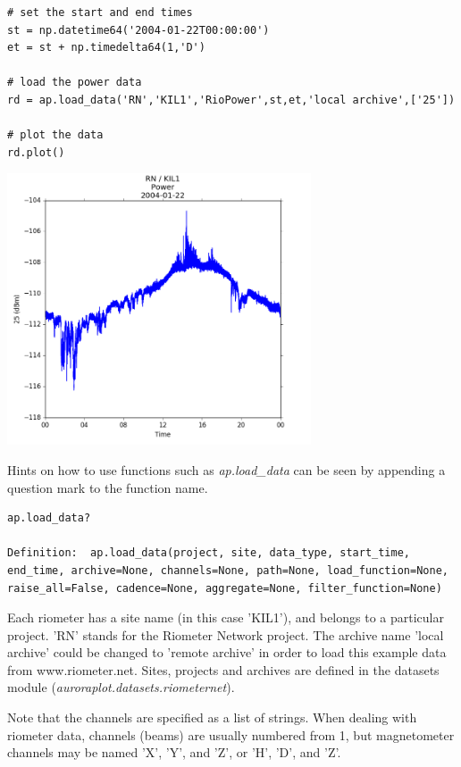 \documentclass{article}
\begin{document}
\begin{lstlisting}[style=pythonstyle]
# set the start and end times
st = np.datetime64('2004-01-22T00:00:00')
et = st + np.timedelta64(1,'D')

# load the power data
rd = ap.load_data('RN','KIL1','RioPower',st,et,'local archive',['25'])

# plot the data
rd.plot()
\end{lstlisting}

\includegraphics[width=9cm]{images/figure_1.png}

Hints on how to use functions such as {\it ap.load\_data} can be seen by appending a question mark to the function name.

\begin{lstlisting}[style=pythonstyle]
ap.load_data?

Definition:  ap.load_data(project, site, data_type, start_time, end_time, archive=None, channels=None, path=None, load_function=None, raise_all=False, cadence=None, aggregate=None, filter_function=None)
\end{lstlisting}

Each riometer has a site name (in this case 'KIL1'), and belongs to a particular project. 'RN' stands for the Riometer Network project. The archive name 'local archive' could be changed to 'remote archive' in order to load this example data from www.riometer.net. Sites, projects and archives are defined in the datasets module ({\it auroraplot.datasets.riometernet}).

Note that the channels are specified as a list of strings. When dealing with riometer data, channels (beams) are usually numbered from 1, but magnetometer channels may be named 'X', 'Y', and 'Z', or 'H', 'D', and 'Z'.
\end{document}
